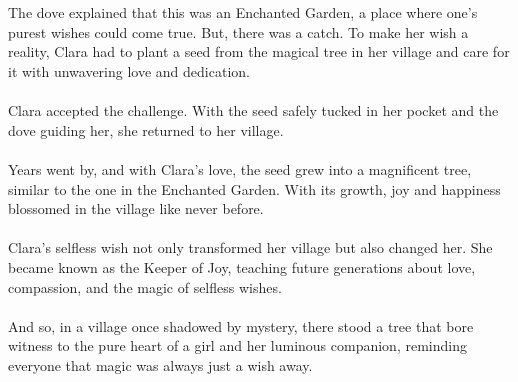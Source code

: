 \documentclass[10pt, fullpage, a4paper, titlepage]{article}
\begin{document}
\\~\\
The dove explained that this was an Enchanted Garden, a place where one’s purest wishes could come true. But, there was a catch. To make her wish a reality, Clara had to plant a seed from the magical tree in her village and care for it with unwavering love and dedication.
\\~\\
Clara accepted the challenge. With the seed safely tucked in her pocket and the dove guiding her, she returned to her village.
\\~\\
Years went by, and with Clara's love, the seed grew into a magnificent tree, similar to the one in the Enchanted Garden. With its growth, joy and happiness blossomed in the village like never before.
\\~\\
Clara's selfless wish not only transformed her village but also changed her. She became known as the Keeper of Joy, teaching future generations about love, compassion, and the magic of selfless wishes.
\\~\\
And so, in a village once shadowed by mystery, there stood a tree that bore witness to the pure heart of a girl and her luminous companion, reminding everyone that magic was always just a wish away.
\end{document}
